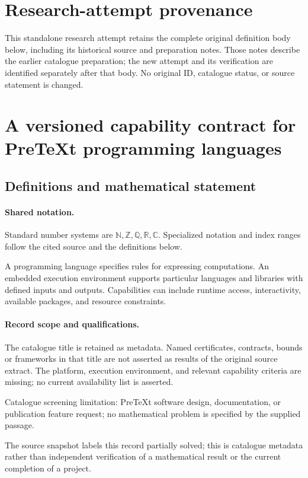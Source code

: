 \documentclass[11pt]{article}
\begin{document}
\section*{Research-attempt provenance}
This standalone research attempt retains the complete original definition body below,
including its historical source and preparation notes. Those notes describe the
earlier catalogue preparation; the new attempt and its verification are identified
separately after that body. No original ID, catalogue status, or source statement is changed.

\section{A versioned capability contract for PreTeXt programming languages}\label{statement}

\subsection{Definitions and mathematical statement}

\paragraph{Shared notation.}Standard number systems are $\mathbb N,\mathbb Z,\mathbb Q,\mathbb R,\mathbb C$. Specialized notation and index ranges follow the cited source and the definitions below.


A programming language specifies rules for expressing computations. An embedded execution environment supports particular languages and libraries with defined inputs and outputs. Capabilities can include runtime access, interactivity, available packages, and resource constraints.
\paragraph{Record scope and qualifications.}
The catalogue title is retained as metadata. Named certificates, contracts, bounds or frameworks in that title are not asserted as results of the original source extract.
The platform, execution environment, and relevant capability criteria are missing; no current availability list is asserted.

Catalogue screening limitation: PreTeXt software design, documentation, or publication feature request; no mathematical problem is specified by the supplied passage.

The source snapshot labels this record partially solved; this is catalogue metadata rather than independent verification of a mathematical result or the current completion of a project.
\end{document}
